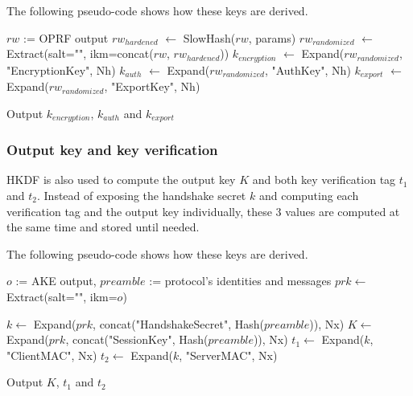 \documentclass[../report.tex]{subfiles}
\begin{document}
The following pseudo-code shows how these keys are derived.
\begin{algorithmic}
\Require $rw$ := OPRF output
\State $rw_{hardened}$ $\gets$ SlowHash($rw$, params)
\State $rw_{randomized}$ $\gets$ Extract(salt="", ikm=concat($rw$, $rw_{hardened}$))
\State $k_{encryption}$ $\gets$ Expand($rw_{randomized}$, "EncryptionKey", Nh)
\State $k_{auth}$ $\gets$ Expand($rw_{randomized}$, "AuthKey", Nh)
\State $k_{export}$ $\gets$ Expand($rw_{randomized}$, "ExportKey", Nh)

\State Output $k_{encryption}$, $k_{auth}$ and $k_{export}$
\end{algorithmic}



% 
% 


\subsubsection{Output key and key verification}

HKDF is also used to compute the output key $K$ and both key verification tag $t_1$ and $t_2$.
Instead of exposing the handshake secret $k$ and computing each verification tag and the output key individually, these 3 values are computed at the same time and stored until needed.

The following pseudo-code shows how these keys are derived.
\begin{algorithmic}
\Require $o$ := AKE output, $preamble$ := protocol's identities and messages
\State $prk \gets$ Extract(salt="", ikm=$o$)


\State $k \gets$ Expand($prk$, concat("HandshakeSecret", Hash($preamble$)), Nx)
\State $K \gets$ Expand($prk$, concat("SessionKey", Hash($preamble$)), Nx)
\State $t_1 \gets$ Expand($k$, "ClientMAC", Nx)
\State $t_2 \gets$ Expand($k$, "ServerMAC", Nx)

\State Output $K$, $t_1$ and $t_2$
\end{algorithmic}
\end{document}
